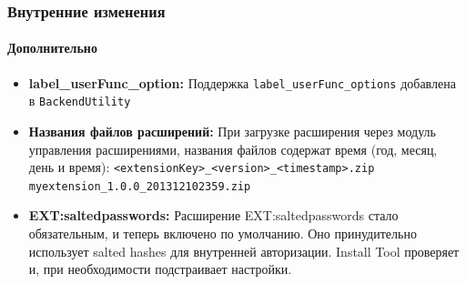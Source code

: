 \begin{frame}[fragile]
	\frametitle{Внутренние изменения}
	\framesubtitle{Дополнительно}

	\begin{itemize}

		\item \textbf{label\_userFunc\_option:}\newline
			\small
				Поддержка \texttt{label\_userFunc\_options} добавлена в \texttt{BackendUtility}
			\normalsize

		\item \textbf{Названия файлов расширений:}\newline
			\small
				При загрузке расширения через модуль управления расширениями, названия файлов содержат время (год, месяц, день и время):\newline
				\texttt{<extensionKey>\_<version>\_<timestamp>.zip}\newline
				\texttt{myextension\_1.0.0\_201312102359.zip}
			\normalsize

		\item \textbf{EXT:saltedpasswords:}\newline
			\small
				Расширение EXT:saltedpasswords стало обязательным, и теперь включено по умолчанию.
				Оно принудительно использует salted hashes для внутренней авторизации. Install Tool проверяет и,
				при необходимости подстраивает настройки.
			\normalsize

	\end{itemize}
	
\end{frame}


